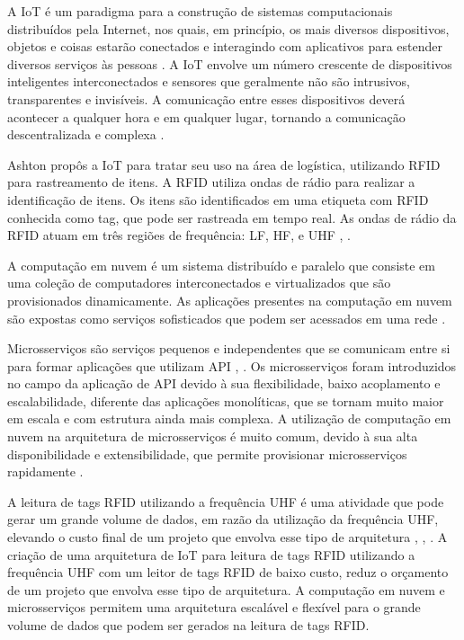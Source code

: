 \label{cap:introducao}

A \acrfull{IoT} é um paradigma para a construção de sistemas computacionais distribuídos pela Internet, nos quais, em princípio, os mais diversos dispositivos, objetos e coisas estarão conectados e interagindo com aplicativos para estender diversos serviços às pessoas \cite{Gubbi2013} \cite{Filho2017DesignNetworks}. A \acrshort{IoT} envolve um número crescente de dispositivos inteligentes interconectados e sensores que geralmente não são intrusivos, transparentes e invisíveis. A comunicação entre esses dispositivos deverá acontecer a qualquer hora e em qualquer lugar, tornando a comunicação descentralizada e complexa \cite{Rayes2017}.

Ashton \cite{Kevin2009} propôs a \acrshort{IoT} para tratar seu uso na área de logística, utilizando \acrfull{RFID} para rastreamento de itens. A \acrshort{RFID} utiliza ondas de rádio para realizar a identificação de itens. Os itens são identificados em uma etiqueta com \acrshort{RFID} conhecida como tag, que pode ser rastreada em tempo real. As ondas de rádio da \acrshort{RFID} atuam em três regiões de frequência: \acrfull{LF}, \acrfull{HF}, e \acrfull{UHF} \cite{Bolic2010}, \cite{Li2016}.

A computação em nuvem é um sistema distribuído e paralelo que consiste em uma coleção de computadores interconectados e virtualizados que são provisionados dinamicamente. As aplicações presentes na computação em nuvem são expostas como serviços sofisticados que podem ser acessados em uma rede \cite{Buyya2009}.

Microsserviços são serviços pequenos e independentes que se comunicam entre si para formar aplicações que utilizam \acrfull{API} \cite{Dragoni2016}, \cite{Lewis2014}. Os microsserviços foram introduzidos no campo da aplicação de \acrshort{API} devido à sua flexibilidade, baixo acoplamento e escalabilidade, diferente das aplicações monolíticas, que se tornam muito maior em escala e com estrutura ainda mais complexa. A utilização de computação em nuvem na arquitetura de microsserviços é muito comum, devido à sua alta disponibilidade e extensibilidade, que permite provisionar microsserviços rapidamente \cite{Sun2017}.

\newpage

A leitura de tags \acrshort{RFID} utilizando a frequência \acrshort{UHF} é uma atividade que pode gerar um grande volume de dados, em razão da utilização da frequência \acrshort{UHF}, elevando o custo final de um projeto que envolva esse tipo de arquitetura \cite{Prudanov2016}, \cite{Farris2017}, \cite{Chieochan2017}. A criação de uma arquitetura de \acrshort{IoT} para leitura de tags \acrshort{RFID} utilizando a frequência \acrshort{UHF} com um leitor de tags \acrshort{RFID} de baixo custo, reduz o orçamento de um projeto que envolva esse tipo de arquitetura. A computação em nuvem e microsserviços permitem uma arquitetura escalável e flexível para o grande volume de dados que podem ser gerados na leitura de tags \acrshort{RFID}.

